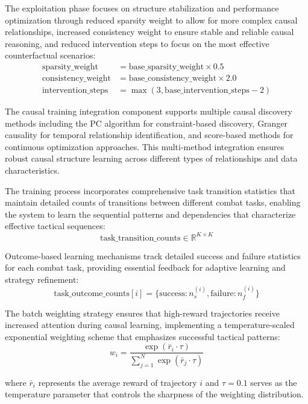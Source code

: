 \documentclass[12pt]{article}
\begin{document}
The exploitation phase focuses on structure stabilization and performance optimization through reduced sparsity weight to allow for more complex causal relationships, increased consistency weight to ensure stable and reliable causal reasoning, and reduced intervention steps to focus on the most effective counterfactual scenarios:
\begin{align}
\text{sparsity\_weight} &= \text{base\_sparsity\_weight} \times 0.5 \\
\text{consistency\_weight} &= \text{base\_consistency\_weight} \times 2.0 \\
\text{intervention\_steps} &= \max(3, \text{base\_intervention\_steps} - 2)
\end{align}

The causal training integration component supports multiple causal discovery methods including the PC algorithm for constraint-based discovery, Granger causality for temporal relationship identification, and score-based methods for continuous optimization approaches. This multi-method integration ensures robust causal structure learning across different types of relationships and data characteristics.

The training process incorporates comprehensive task transition statistics that maintain detailed counts of transitions between different combat tasks, enabling the system to learn the sequential patterns and dependencies that characterize effective tactical sequences:
\begin{equation}
\text{task\_transition\_counts} \in \mathbb{R}^{K \times K}
\end{equation}

Outcome-based learning mechanisms track detailed success and failure statistics for each combat task, providing essential feedback for adaptive learning and strategy refinement:
\begin{equation}
\text{task\_outcome\_counts}[i] = \{\text{success}: n_s^{(i)}, \text{failure}: n_f^{(i)}\}
\end{equation}

The batch weighting strategy ensures that high-reward trajectories receive increased attention during causal learning, implementing a temperature-scaled exponential weighting scheme that emphasizes successful tactical patterns:
\begin{equation}
w_i = \frac{\exp(\bar{r}_i \cdot \tau)}{\sum_{j=1}^{N} \exp(\bar{r}_j \cdot \tau)}
\end{equation}

where $\bar{r}_i$ represents the average reward of trajectory $i$ and $\tau = 0.1$ serves as the temperature parameter that controls the sharpness of the weighting distribution.
\end{document}
